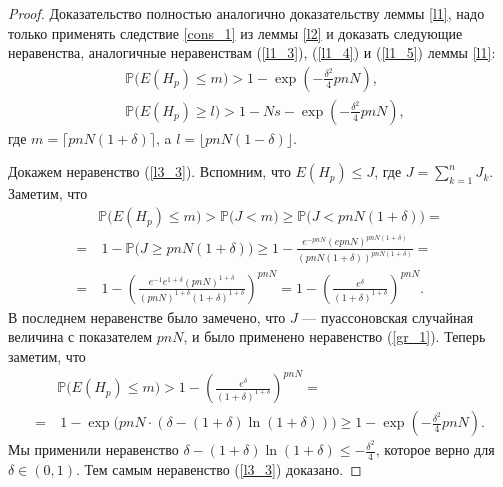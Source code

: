 \documentclass{matmex-diploma-custom}
\newcommand{\PRob}{\mathbb P}
\newcommand{\leqs}{\leqslant}
\newcommand{\geqs}{\geqslant}
\theoremstyle{named}
\begin{document}
\begin{proof}
Доказательство полностью аналогично доказательству леммы \ref{l1}, надо только применять следствие \ref{cons_1} из леммы \ref{l2}
и доказать следующие неравенства, 
аналогичные неравенствам (\ref{l1_3}), (\ref{l1_4}) и (\ref{l1_5}) леммы \ref{l1}:
\begin{align} \label{l3_3}
&\PRob\big( E(H_p) \leqs m \big) > 1 - \exp\left(-\frac{\delta^2}{4}pnN\right),
\\ \label{l3_4}
&\PRob\big( E(H_p) \geqs l \big) > 1 - Ns - \exp\left(-\frac{\delta^2}{4}pnN\right),
\end{align}
где $m = \lceil pnN(1+\delta) \rceil$, a  $l = \lfloor pnN(1-\delta) \rfloor$.

Докажем неравенство (\ref{l3_3}). Вспомним, что $E(H_p) \leqs J$, где $J = \sum\limits_{k = 1}^n J_k$. Заметим, что
\begin{equation}\label{l3_5}\begin{aligned}
&\PRob\big( E(H_p) \leqs m \big) > \PRob\big( J < m \big) \geqs \PRob\big( J < pnN(1+\delta) \big) 
=
\\
= 
&~1 - \PRob\big( J \geqs pnN(1+\delta) \big) \geqs 1 - \frac{e^{-pnN}(epnN)^{pnN(1+\delta)}}{(pnN(1+\delta))^{pnN(1+\delta)}}
=
\\
=
&~1 - \left( \frac{e^{-1} e^{1+\delta}(pnN)^{1+\delta}}{(pnN)^{1+\delta}(1+\delta)^{1+\delta}} \right)^{pnN}
=
1 - \left( \frac{e^\delta}{(1+\delta)^{1+\delta}} \right)^{pnN}.
\end{aligned}\end{equation}
В последнем неравенстве было замечено, что $J$ --- пуассоновская случайная величина с показателем $pnN$, 
и было применено неравенство (\ref{gr_1}).
Теперь заметим, что 
\begin{equation}\begin{aligned}
&\PRob\big( E(H_p) \leqs m \big) > 1 - \left( \frac{e^\delta}{(1+\delta)^{1+\delta}} \right)^{pnN}
=
\\
=
&~1 - \exp\big(pnN \cdot (\delta - (1+\delta) \ln(1+\delta)) \big)
\geqs
 1 - \exp\left(-\frac{\delta^2}{4}pnN\right).
\end{aligned}\end{equation}
Мы применили неравенство $\delta - (1+\delta) \ln(1+\delta) \leqs - \frac{\delta^2}{4}$, 
которое верно для $\delta \in (0,1)$. Тем самым неравенство (\ref{l3_3}) доказано.


\end{proof}
\end{document}
